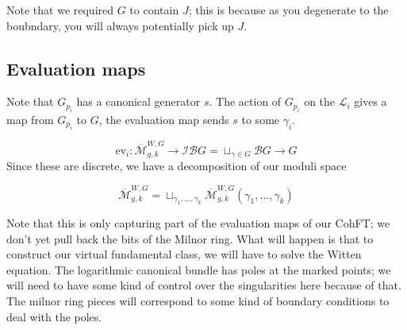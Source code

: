 \documentclass{amsart}
\theoremstyle{definition}
\newcommand{\ev}{\text{ev}}
\newcommand{\Mbar}{\overline{\mathcal{M}}}
\begin{document}
Note that we required $G$ to contain $J$; this is because as you degenerate to the boubndary, you will always potentially pick up $J$.

\subsection{Evaluation maps}

Note that $G_{p_i}$ has a canonical generator $s$.  The action of $G_{p_i}$ on the $\mathcal{L}_i$ gives a map from $G_{p_i}$ to $G$, the evaluation map sends $s$ to some $\gamma_i$.

$$\ev_i:\Mbar_{g,k}^{W,G}\to \mathcal{IB}G=\sqcup_{\gamma\in G} \mathcal{B}G\to G$$
Since these are discrete, we have a decomposition of our moduli space

$$\Mbar_{g,k}^{W,G}=\sqcup_{\gamma_1,\dots, \gamma_k} \Mbar_{g,k}^{W,G}(\gamma_1,\dots, \gamma_k)$$

Note that this is only capturing part of the evaluation maps of our CohFT; we don't yet pull back the bits of the Milnor ring.  What will happen is that to construct our virtual fundamental class, we will have to solve the Witten equation.  The logarithmic canonical bundle has poles at the marked points; we will need to have some kind of control over the singularities here because of that.  The milnor ring pieces will correspond to some kind of boundary conditions to deal with the poles. 
\end{document}
